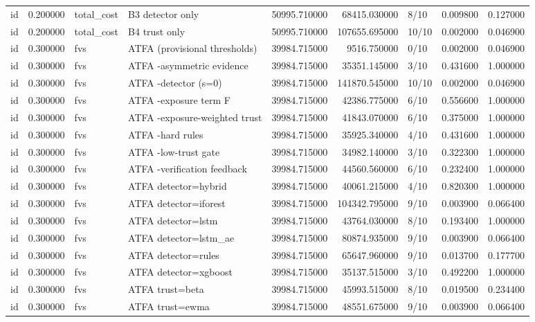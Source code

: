 \begin{tabular}{lrllrrlrr}
id & 0.200000 & total\_cost & B3 detector only & 50995.710000 & 68415.030000 & 8/10 & 0.009800 & 0.127000 \\
id & 0.200000 & total\_cost & B4 trust only & 50995.710000 & 107655.695000 & 10/10 & 0.002000 & 0.046900 \\
id & 0.300000 & fvs & ATFA (provisional thresholds) & 39984.715000 & 9516.750000 & 0/10 & 0.002000 & 0.046900 \\
id & 0.300000 & fvs & ATFA -asymmetric evidence & 39984.715000 & 35351.145000 & 3/10 & 0.431600 & 1.000000 \\
id & 0.300000 & fvs & ATFA -detector (s=0) & 39984.715000 & 141870.545000 & 10/10 & 0.002000 & 0.046900 \\
id & 0.300000 & fvs & ATFA -exposure term F & 39984.715000 & 42386.775000 & 6/10 & 0.556600 & 1.000000 \\
id & 0.300000 & fvs & ATFA -exposure-weighted trust & 39984.715000 & 41843.070000 & 6/10 & 0.375000 & 1.000000 \\
id & 0.300000 & fvs & ATFA -hard rules & 39984.715000 & 35925.340000 & 4/10 & 0.431600 & 1.000000 \\
id & 0.300000 & fvs & ATFA -low-trust gate & 39984.715000 & 34982.140000 & 3/10 & 0.322300 & 1.000000 \\
id & 0.300000 & fvs & ATFA -verification feedback & 39984.715000 & 44560.560000 & 6/10 & 0.232400 & 1.000000 \\
id & 0.300000 & fvs & ATFA detector=hybrid & 39984.715000 & 40061.215000 & 4/10 & 0.820300 & 1.000000 \\
id & 0.300000 & fvs & ATFA detector=iforest & 39984.715000 & 104342.795000 & 9/10 & 0.003900 & 0.066400 \\
id & 0.300000 & fvs & ATFA detector=lstm & 39984.715000 & 43764.030000 & 8/10 & 0.193400 & 1.000000 \\
id & 0.300000 & fvs & ATFA detector=lstm\_ae & 39984.715000 & 80874.935000 & 9/10 & 0.003900 & 0.066400 \\
id & 0.300000 & fvs & ATFA detector=rules & 39984.715000 & 65647.960000 & 9/10 & 0.013700 & 0.177700 \\
id & 0.300000 & fvs & ATFA detector=xgboost & 39984.715000 & 35137.515000 & 3/10 & 0.492200 & 1.000000 \\
id & 0.300000 & fvs & ATFA trust=beta & 39984.715000 & 45993.515000 & 8/10 & 0.019500 & 0.234400 \\
id & 0.300000 & fvs & ATFA trust=ewma & 39984.715000 & 48551.675000 & 9/10 & 0.003900 & 0.066400 \\

\end{tabular}
